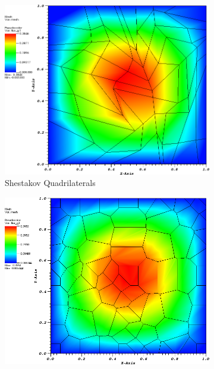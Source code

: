 \begin{figure}
{\begin{subfigure}[b]{0.465\textwidth}
	\end{subfigure}
}
\vspace{3mm}
{
	\begin{subfigure}[b]{0.465\textwidth}
		\centering
		\label{subfig::x2y2_shes_quad_me_k2_lin_sol}
		\includegraphics[width=\textwidth]{figures/sec_BF/x2y2Sol_ShesQuad_ME2_Rev1.png}
		\caption{Shestakov Quadrilaterals}
	\end{subfigure}
	\hfill
	\begin{subfigure}[b]{0.460\textwidth}
		\centering
		\label{subfig::x2y2_smooth_poly_me_k2_lin_sol}
		\includegraphics[width=\textwidth]{figures/sec_BF/x2y2Sol_SinePoly_ME2.png}

\end{subfigure}}
\end{figure}
